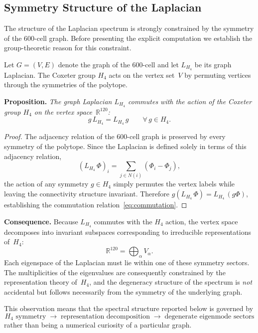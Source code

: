 \documentclass[12pt,a4paper]{article}
\newcommand{\Hfour}{H_4}
\newcommand{\Lmat}{L_{H_4}}
\newcommand{\R}{\mathbb{R}}
\begin{document}
\subsection{Symmetry Structure of the Laplacian}\label{sec:sym_laplacian}

The structure of the Laplacian spectrum is strongly constrained by the
symmetry of the 600-cell graph.  Before presenting the explicit computation we
establish the group-theoretic reason for this constraint.

Let $G = (V, E)$ denote the graph of the 600-cell and let $\Lmat$ be its
graph Laplacian.  The Coxeter group $\Hfour$ acts on the vertex set~$V$ by
permuting vertices through the symmetries of the polytope.

\medskip
\noindent\textbf{Proposition.}\;
\textit{The graph Laplacian $\Lmat$ commutes with the action of the Coxeter
group $\Hfour$ on the vertex space~$\R^{120}$:}
\begin{equation}\label{eq:commutation}
  g\,\Lmat = \Lmat\,g \qquad \forall\, g \in \Hfour.
\end{equation}

\begin{proof}
The adjacency relation of the 600-cell graph is preserved by every symmetry of
the polytope.  Since the Laplacian is defined solely in terms of this adjacency
relation,
\[
  (\Lmat\,\Phi)_i = \sum_{j \in N(i)} (\Phi_i - \Phi_j),
\]
the action of any symmetry $g \in \Hfour$ simply permutes the vertex labels
while leaving the connectivity structure invariant.  Therefore
$g(\Lmat\,\Phi) = \Lmat\,(g\Phi)$, establishing the commutation
relation~\eqref{eq:commutation}.
\end{proof}

\noindent\textbf{Consequence.}\;
Because $\Lmat$ commutes with the $\Hfour$ action, the vertex space
decomposes into invariant subspaces corresponding to irreducible
representations of~$\Hfour$:
\begin{equation}\label{eq:decomp}
  \R^{120} = \bigoplus_{\alpha} V_\alpha.
\end{equation}
Each eigenspace of the Laplacian must lie within one of these symmetry
sectors.  The multiplicities of the eigenvalues are consequently constrained
by the representation theory of~$\Hfour$, and the degeneracy structure of the
spectrum is \emph{not} accidental but follows necessarily from the symmetry of
the underlying graph.

This observation means that the spectral structure reported below is governed
by
\[
  \Hfour\text{ symmetry}
  \;\longrightarrow\;
  \text{representation decomposition}
  \;\longrightarrow\;
  \text{degenerate eigenmode sectors}
\]
rather than being a numerical curiosity of a particular graph.
\end{document}
